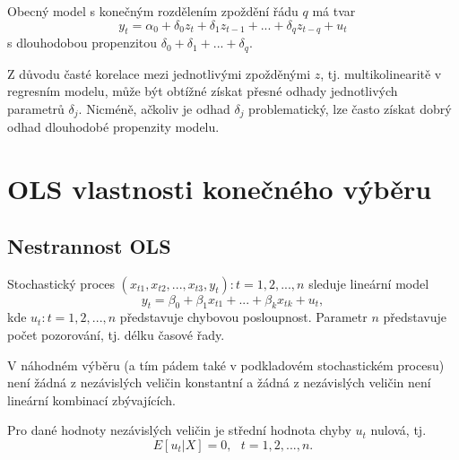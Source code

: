 Obecný model s konečným rozdělením zpoždění řádu $q$ má tvar
\begin{equation}
	y_t = \alpha_0 + \delta_0 z_t + \delta_1 z_{t - 1} + ... + \delta_q 
	z_{t - q} + u_t
\end{equation}
s dlouhodobou propenzitou $\delta_0 + \delta_1 + ... + \delta_q$.

Z důvodu časté korelace mezi jednotlivými zpožděnými $z$, 
tj. multikolinearitě v regresním modelu, může být obtížné 
získat přesné odhady jednotlivých parametrů $\delta_j$. Nicméně, 
ačkoliv je odhad $\delta_j$ problematický, lze často získat dobrý 
odhad dlouhodobé propenzity modelu.

\section{OLS vlastnosti konečného výběru}

\subsection{Nestrannost OLS}

\begin{assumption}
Stochastický proces ${(x_{t1}, x_{t2}, ..., x_{t3}, y_t): t = 1, 2, 
..., n}$ sleduje lineární model
\begin{equation}
y_t = \beta_0 + \beta_1 x_{t1} + ... + \beta_k x_{tk} + u_t,
\end{equation}
kde ${u_t: t = 1, 2, ..., n}$ představuje chybovou posloupnost. 
Parametr $n$ představuje počet pozorování, tj. délku časové řady.

\raggedleft{$\clubsuit$}
\end{assumption}

\begin{assumption}
V náhodném výběru (a tím pádem také v podkladovém stochastickém 
procesu) není žádná z nezávislých veličin konstantní a 
žádná z nezávislých veličin není lineární kombinací zbývajících.

\raggedleft{$\clubsuit$}
\end{assumption}

\begin{assumption}
Pro dané hodnoty nezávislých veličin je střední hodnota 
chyby $u_t$ nulová, tj.
\begin{equation}
E[u_t | X] = 0, ~~~ t = 1, 2, ..., n.
\end{equation}


\raggedleft{$\clubsuit$}
\end{assumption}

